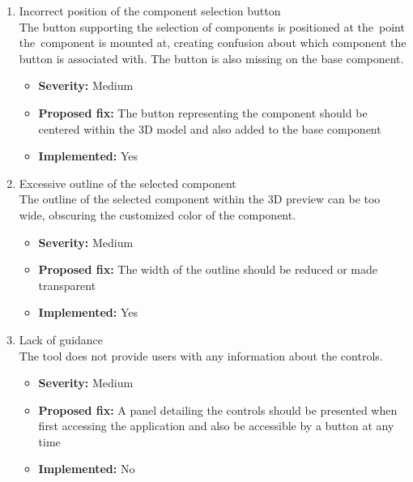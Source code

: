 \begin{enumerate}[label=\textbf{I\arabic*:}, leftmargin=27pt]
    \item Incorrect position of the component selection button
        \vspace{2pt}
        \\The button supporting the selection of components is positioned at the~point the~component is mounted at, creating confusion about which component the button is associated with. The button is also missing on the base component.
        \begin{itemize}[noitemsep, label=\trianglebullet]
            \item \textbf{Severity:} Medium
            \item \textbf{Proposed fix:} The button representing the component should be centered within the 3D model and also added to the base component
            \item \textbf{Implemented:} Yes
        \end{itemize}
        \vspace{4pt}

    \item Excessive outline of the selected component
        \vspace{2pt}
        \\The outline of the selected component within the 3D preview can be too wide, obscuring the customized color of the component.
        \begin{itemize}[noitemsep, label=\trianglebullet]
            \item \textbf{Severity:} Medium
            \item \textbf{Proposed fix:} The width of the outline should be reduced or made transparent
            \item \textbf{Implemented:} Yes
        \end{itemize}
        \vspace{4pt}

    \item Lack of guidance
        \vspace{2pt}
        \\The tool does not provide users with any information about the controls.
        \begin{itemize}[noitemsep, label=\trianglebullet]
            \item \textbf{Severity:} Medium
            \item \textbf{Proposed fix:} A panel detailing the controls should be presented when first accessing the application and also be accessible by a button at any time
            \item \textbf{Implemented:} No
        \end{itemize}
        \vspace{4pt}


\end{enumerate}
